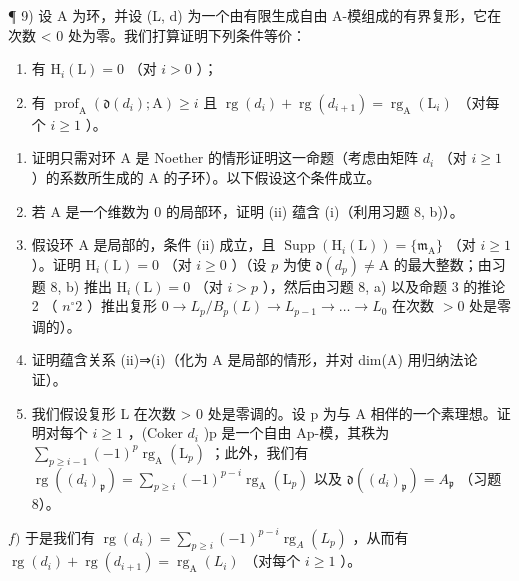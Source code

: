 ¶ 9) 设 A 为环，并设 (L, d) 为一个由有限生成自由 A-模组成的有界复形，它在次数 \textless{} 0 处为零。我们打算证明下列条件等价：

\begin{enumerate}
\def\labelenumi{(\roman{enumi})}
\item
  有 \(\mathrm{H}_i(\mathrm{L}) = 0\) （对 \(i > 0\) ）；
\item
  有 \(\operatorname{prof}_{\mathrm{A}}(\mathfrak{d}(d_i); \mathrm{A}) \geqslant i\) 且 \(\operatorname{rg}(d_i) + \operatorname{rg}(d_{i+1}) = \operatorname{rg}_{\mathrm{A}}(\mathrm{L}_i)\) （对每个 \(i \geqslant 1\) ）。
\end{enumerate}

\begin{enumerate}
\def\labelenumi{\alph{enumi})}
\item
  证明只需对环 A 是 Noether 的情形证明这一命题（考虑由矩阵 \(d_{i}\) （对 \(i \geqslant 1\) ）的系数所生成的 A 的子环）。以下假设这个条件成立。
\item
  若 A 是一个维数为 0 的局部环，证明 (ii) 蕴含 (i)（利用习题 8, b)）。
\item
  假设环 A 是局部的，条件 (ii) 成立，且 \(\operatorname{Supp}(\mathrm{H}_i(\mathrm{L})) = \{\mathfrak{m}_{\mathrm{A}}\}\) （对 \(i \geqslant 1\) ）。证明 \(\mathrm{H}_i(\mathrm{L}) = 0\) （对 \(i \geqslant 0\) ）（设 \(p\) 为使 \(\mathfrak{d}(d_p) \neq \mathrm{A}\) 的最大整数；由习题 8, b) 推出 \(\mathrm{H}_i(\mathrm{L}) = 0\) （对 \(i > p\) ），然后由习题 8, a) 以及命题 3 的推论 2 （ \(n^{\circ} 2\) ）推出复形 \(0 \to L_p / B_p(L) \to L_{p-1} \to \ldots \to L_0\) 在次数 \(>0\) 处是零调的）。
\item
  证明蕴含关系 (ii)⇒(i)（化为 A 是局部的情形，并对 dim(A) 用归纳法论证）。
\item
  我们假设复形 L 在次数 \textgreater{} 0 处是零调的。设 p 为与 A 相伴的一个素理想。证明对每个 \(i \geqslant 1\) ，(Coker \(d_{i}\) )p 是一个自由 Ap-模，其秩为 \(\sum_{p \geqslant i-1} (-1)^{p} \operatorname{rg}_{\mathrm{A}}(\mathrm{L}_{p})\) ；此外，我们有 \(\operatorname{rg}((d_{i})_{\mathfrak{p}}) = \sum_{p \geqslant i} (-1)^{p-i} \operatorname{rg}_{\mathrm{A}}(\mathrm{L}_{p})\) 以及 \(\mathfrak{d}((d_{i})_{\mathfrak{p}}) = A_{\mathfrak{p}}\) （习题 8）。
\end{enumerate}

\(f)\) 于是我们有 \(\operatorname{rg}(d_i) = \sum_{p \geqslant i} (-1)^{p - i} \operatorname{rg}_A(L_p)\) ，从而有 \(\operatorname{rg}(d_i) + \operatorname{rg}(d_{i+1}) = \operatorname{rg}_\mathrm{A}(L_i)\) （对每个 \(i \geqslant 1\) ）。

